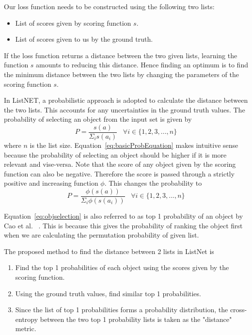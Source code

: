 \documentclass[12pt, twoside, ngerman]{report}
\begin{document}
Our loss function needs to be constructed using the following two lists:
\begin{itemize}
\item List of scores given by scoring function $s$.
\item List of scores given to us by the ground truth.
\end{itemize}
If the loss function returns a distance between the two given lists, learning the function $s$ amounts to reducing this distance. Hence finding an optimum is to find the minimum distance between the two lists by changing the parameters of the scoring function $s$.

In ListNET, a probabilistic approach is adopted to calculate the distance between the two lists. This accounts for any uncertainties in the ground truth values.
The probability of selecting an object from the input set is given by
\begin{equation}
\label{eq:basicProbEquation}
P = \frac{s(a)}{\Sigma_i s(a_i)} \;\;\; \forall i \in \{1, 2, 3, ...,  n\}
\end{equation}
where $n$ is the list size.
Equation~\ref{eq:basicProbEquation} makes intuitive sense because the probability of selecting an object should be higher if it is more relevant and vise-versa.
Note that the score of any object given by the scoring function can also be negative.
Therefore the score is passed through a strictly positive and increasing function $\phi$.
This changes the probability to
\begin{equation}\label{eq:objselection}
P = \frac{\phi(s(a))}{\Sigma_i \phi(s(a_i))} \;\;\; \forall i \in \{1, 2, 3, ...,  n\}
\end{equation}

Equation~\ref{eq:objselection} is also referred to as top 1 probability of an object by Cao et al. ~\cite{listwisebetter}.
This is because this gives the probability of ranking the object first when we are calculating the permutation probability of given list.

The proposed method to find the distance between 2 lists in ListNet is
\begin{enumerate}
\item Find the top 1 probabilities of each object using the scores given by the scoring function.
\item Using the ground truth values, find similar top 1 probabilities.
\item Since the list of top 1 probabilities forms a probability distribution, the cross-entropy between the two top 1 probability lists is taken as the "distance" metric.
\end{enumerate}
\end{document}
